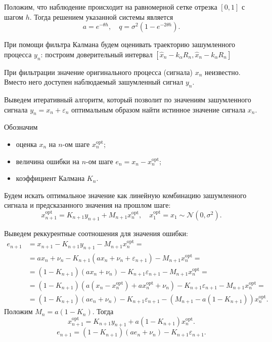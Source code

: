 \documentclass[11pt]{report}
\begin{document}
Положим, что наблюдение происходит на равномерной сетке отрезка $[0,1]$ с шагом $h$. Тогда решением указанной системы является
$$
a = e^{-\theta h},\quad q = \sigma^2(1 - e^{-2\theta h}).
$$

При помощи фильтра Калмана будем оценивать траекторию зашумленного процесса $y_n$: построим доверительный интервал $[\hat x_n-k_\alpha R_n,\hat x_n-k_\alpha R_n]$

При фильтрации значение оригинального процесса (сигнала) $x_n$ неизвестно. Вместо него доступен наблюдаемый зашумленный сигнал $y_n$.

Выведем итеративный алгоритм, который позволит по значениям зашумленного сигнала $y_n = x_n + \varepsilon_n$ оптимальным образом найти истинное значение сигнала $x_n$.

Обозначим
\begin{itemize}
\item оценка $x_n$ на $n$-ом шаге $x_n^{\operatorname{opt}}$;
\item величина ошибки на $n$-ом шаге $e_n = x_n - x_n^{\operatorname{opt}}$;
\item коэффициент Калмана $K_{n}$.
\end{itemize}

Будем искать оптимальное значение как линейную комбинацию зашумленного сигнала и предсказанного значения на прошлом шаге:
$$
x_{n+1}^{\operatorname{opt}} = K_{n+1}y_{n+1} + M_{n+1}x_n^{\operatorname{opt}},\quad x_1^{\operatorname{opt}} = x_1\sim\mathcal{N}(0,\sigma^2).
$$

Выведем реккурентные соотношения для значения ошибки:
$$
\begin{aligned}
e_{n+1} &= x_{n+1} - K_{n+1}y_{n+1} - M_{n+1}x_n^{\operatorname{opt}} = \\
&= ax_n + \nu_n - K_{n+1}(ax_n + \nu_n + \varepsilon_{n+1}) - M_{n+1}x_n^{\operatorname{opt}} = \\
&= (1 - K_{n+1})(ax_n + \nu_n) - K_{n+1}\varepsilon_{n+1} - M_{n+1}x_n^{\operatorname{opt}} = \\
&= (1 - K_{n+1})(a(x_n-x_n^{\operatorname{opt}}) + ax_n^{\operatorname{opt}} + \nu_n) - K_{n+1}\varepsilon_{n+1} - M_{n+1}x_n^{\operatorname{opt}} = \\
&= (1 - K_{n+1})(ae_n + \nu_n) - K_{n+1}\varepsilon_{n+1} - (M_{n+1} - a(1 - K_{n+1}))x_n^{\operatorname{opt}}.
\end{aligned}
$$
Положим $M_n = a(1 - K_n)$. Тогда
$$
x_{n+1}^{\operatorname{opt}} = K_{n+1}y_{n+1} + a(1 - K_{n+1})x_n^{\operatorname{opt}}.
$$
$$
e_{n+1} = (1 - K_{n+1})(ae_n + \nu_n) - K_{n+1}\varepsilon_{n+1}.
$$
\end{document}
